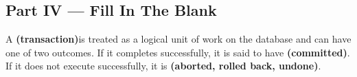\documentclass[12pt, addpoints]{exam}
\begin{document}
\begin{questions}
\section*{Part IV — Fill In The Blank}

\begin{minipage}{\linewidth}
\question[2]
A \fillin[][8em] \ifprintanswers\textbf{(transaction)}\fi is treated as a logical unit of work on the database and can have one of two outcomes. 
If it completes successfully, it is said to have \fillin[][8em] \ifprintanswers\textbf{(committed)}\fi. 
If it does not execute successfully, it is \fillin[][8em] \ifprintanswers\textbf{(aborted, rolled back, undone)}\fi.
\end{minipage}
\end{questions}
\end{document}
